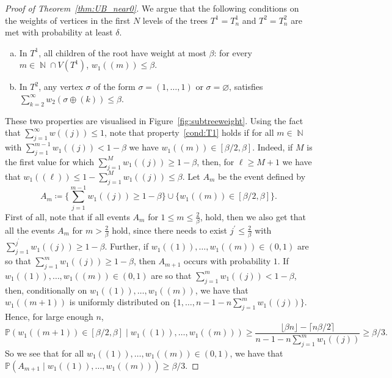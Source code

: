 \documentclass[11pt]{article}
\numberwithin{equation}{section}
\DeclareMathOperator{\N}{\mathbb{N}} %
\newcommand{\p}{\mathbb{P}} %
\theoremstyle{definition}
\begin{document}
\begin{proof}[Proof of Theorem~\ref{thm:UB_near0}]
    We argue that the following conditions on the weights of vertices in the first $N$ levels of the trees $T^1=T^1_n$ and $T^2=T^2_n$ are met with probability at least $\delta$. 
    \begin{enumerate}[(a)]
        \item In $T^1$, all children of the root have weight at most $\beta$: for every $m \in \N \cap V(T^1) $, $w_1((m))\leq\beta$. \label{cond:T1}
        \item In $T^2$, any vertex $\sigma$ of the form $\sigma=(1,\ldots,1)$ or  $\sigma = \varnothing$, satisfies $\sum_{k=2}^{\infty} w_2(\sigma\oplus (k)) \leq \beta$.  \label{cond:T2}
    \end{enumerate}
    These two properties are visualised in Figure~\ref{fig:subtreeweight}. Using the fact that $\sum_{j= 1}^{\infty}w((j))\leq 1$, note that  property~\eqref{cond:T1} holds if for all $m \in \N$ with $\sum_{j=1}^{m-1} w_1({(j)}) < 1-\beta$ we have $w_1({(m)})\in [\beta/2, \beta]$. Indeed, if $M$ is the first value for which $\sum_{j=1}^{M} w_1({(j)}) \geq 1-\beta$, then, for $\ell \geq M+1$ we have that $w_1({(\ell)}) \leq 1 - \sum_{j=1}^{M} w_1({(j)}) \leq \beta$.
    Let $A_m$ be the event defined by
    \begin{equation*}
        A_m \coloneqq \Big\{ \sum_{j=1}^{m-1} w_1((j)) \geq 1- \beta \Big\} \cup \Big\{ w_1((m)) \in \left[\beta/2,\beta\right] \Big\} .
    \end{equation*}
    First of all, note that if all events $A_m$ for $1\leq m \leq \frac{2}{\beta}$, hold, then we also get that all the events $A_m$ for  $m > \frac{2}{\beta}$ hold, since there needs to exist $j^\prime \leq \frac{2}{\beta}$ with $\sum_{j=1}^{j^\prime} w_1((j)) \geq 1-\beta$. Further, if $w_1((1)),\ldots, w_1((m)) \in (0,1)$ are so that $\sum_{j=1}^m w_1((j)) \geq 1-\beta$, then $A_{m+1}$ occurs with probability $1$. If $w_1((1)),\ldots, w_1((m)) \in (0,1)$ are so that $\sum_{j=1}^m w_1((j)) < 1-\beta$, then, conditionally on $w_1((1)),\ldots, w_1((m))$, we have that $w_1((m+1))$ is uniformly distributed on $\{1,\ldots,n - 1 - n\sum_{j=1}^m w_1((j))\}$. Hence, for large enough $n$, 
    \begin{equation*}
        \p \left(w_1((m+1)) \in \left[\beta/2,\beta\right] \mid w_1((1)),\ldots, w_1((m)) \right) \geq \frac{\lfloor \beta n \rfloor - \lceil n \beta/2 \rceil}{n - 1 - n\sum_{j=1}^m w_1((j))} \geq \beta / 3.
    \end{equation*}
    So we see that for all $w_1((1)),\ldots, w_1((m)) \in (0,1)$, we have that $\p \left( A_{m+1} \mid w_1((1)),\ldots, w_1((m)) \right) \geq \beta/3$.

\end{proof}
\end{document}
